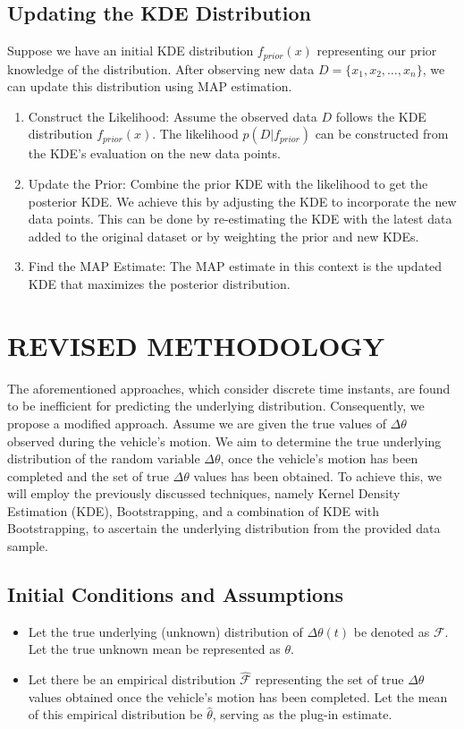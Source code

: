 \documentclass[conference]{IEEEtran}
\begin{document}
\subsection{Updating the KDE Distribution}
Suppose we have an initial KDE distribution \( f_{prior}(x) \) representing our prior knowledge of the distribution. After observing new data \( D = \{x_1, x_2, \ldots, x_n\} \), we can update this distribution using MAP estimation.
\begin{enumerate}

\item Construct the Likelihood: Assume the observed data \( D \) follows the KDE distribution \( f_{prior}(x) \). The likelihood \( p(D | f_{prior}) \) can be constructed from the KDE's evaluation on the new data points.

\item Update the Prior: Combine the prior KDE with the likelihood to get the posterior KDE. We achieve this by adjusting the KDE to incorporate the new data points. This can be done by re-estimating the KDE with the latest data added to the original dataset or by weighting the prior and new KDEs.

\item Find the MAP Estimate: The MAP estimate in this context is the updated KDE that maximizes the posterior distribution.
\end{enumerate}
\section{REVISED METHODOLOGY}

The aforementioned approaches, which consider discrete time instants, are found to be inefficient for predicting the underlying distribution. Consequently, we propose a modified approach. Assume we are given the true values of $\Delta\theta$ observed during the vehicle's motion. We aim to determine the true underlying distribution of the random variable $\Delta\theta$, once the vehicle's motion has been completed and the set of true $\Delta\theta$ values has been obtained. To achieve this, we will employ the previously discussed techniques, namely Kernel Density Estimation (KDE), Bootstrapping, and a combination of KDE with Bootstrapping, to ascertain the underlying distribution from the provided data sample.

\subsection{Initial Conditions and Assumptions}
\begin{itemize}
    \item Let the true underlying (unknown) distribution of $\Delta\theta(t)$ be denoted as $\mathcal{F}$. Let the true unknown mean be represented as $\theta$.
    \item Let there be an empirical distribution $\hat{\mathcal{F}}$ representing the set of true $\Delta\theta$ values obtained once the vehicle's motion has been completed. Let the mean of this empirical distribution be $\hat{\theta}$, serving as the plug-in estimate.
    
\end{itemize}
\end{document}

